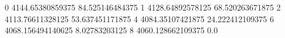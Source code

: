 0 4144.65380859375 84.525146484375
1 4128.64892578125 68.520263671875
2 4113.76611328125 53.637451171875
4 4084.35107421875 24.222412109375
6 4068.156494140625 8.02783203125
8 4060.128662109375 0.0
